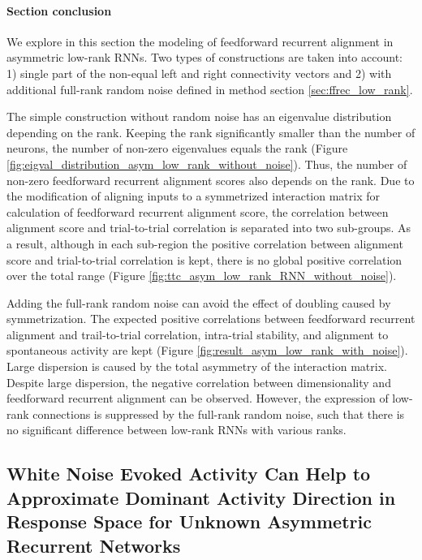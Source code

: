 \documentclass[11pt]{article}
\begin{document}
	\newpage
	\paragraph{Section conclusion}
	We explore in this section the modeling of feedforward recurrent alignment in asymmetric low-rank RNNs. Two types of constructions are taken into account: 1) single part of the non-equal left and right connectivity vectors and 2) with additional full-rank random noise defined in method section \ref{sec:ffrec_low_rank}. 
	
	The simple construction without random noise has an eigenvalue distribution depending on the rank. Keeping the rank significantly smaller than the number of neurons, the number of non-zero eigenvalues equals the rank (Figure \ref{fig:eigval_distribution_asym_low_rank_without_noise}). Thus, the number of non-zero feedforward recurrent alignment scores also depends on the rank. Due to the modification of aligning inputs to a symmetrized interaction matrix for calculation of feedforward recurrent alignment score, the correlation between alignment score and trial-to-trial correlation is separated into two sub-groups. As a result, although in each sub-region the positive correlation between alignment score and trial-to-trial correlation is kept, there is no global positive correlation over the total range (Figure \ref{fig:ttc_asym_low_rank_RNN_without_noise}). 
	
	Adding the full-rank random noise can avoid the effect of doubling caused by symmetrization. The expected positive correlations between feedforward recurrent alignment and trail-to-trial correlation, intra-trial stability, and alignment to spontaneous activity are kept (Figure \ref{fig:result_asym_low_rank_with_noise}). Large dispersion is caused by the total asymmetry of the interaction matrix. Despite large dispersion, the negative correlation between dimensionality and feedforward recurrent alignment can be observed. However, the expression of low-rank connections is suppressed by the full-rank random noise, such that there is no significant difference between low-rank RNNs with various ranks. 
	
	\clearpage
	\subsection{White Noise Evoked Activity Can Help to Approximate Dominant Activity Direction in Response Space for Unknown Asymmetric Recurrent Networks} \label{sec:black_box_result}
\end{document}
